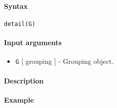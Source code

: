 


	\paragraph{Syntax}

\begin{verbatim}
detail(G)
\end{verbatim}

\paragraph{Input arguments}

\begin{itemize}
\itemsep1pt\parskip0pt
\item
  \texttt{G} {[} grouping {]} - Grouping object.
\end{itemize}

\paragraph{Description}

\paragraph{Example}


